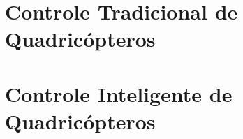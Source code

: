 %
%
\section{Controle Tradicional de Quadricópteros}
\label{sec:trab-rel-tradicional}



\section{Controle Inteligente de Quadricópteros}
\label{sec:trab-rel-inteligenge}



%
